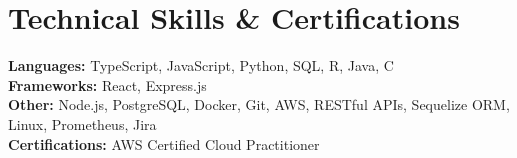 \documentclass[letterpaper]{article}
\begin{document}
\color{NavyBlue}
\section{Technical Skills \& Certifications}
\color{Black}
 \begin{itemize}[leftmargin=0.15in, label={}]
    \small{\item{
        \textbf{Languages:}{ TypeScript, JavaScript, Python, SQL, R, Java, C} \\
        \textbf{Frameworks:}{ React, Express.js } \\
        \textbf{Other:}{ Node.js, PostgreSQL, Docker, Git, AWS, RESTful APIs, Sequelize ORM, Linux, Prometheus, Jira} \\
        \textbf{Certifications:}{ AWS Certified Cloud Practitioner}
    }}
 \end{itemize}
 

\end{document}
